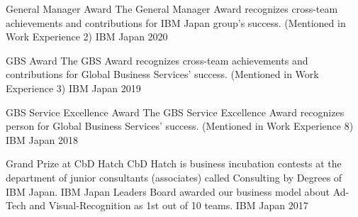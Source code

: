 



\begin{cvhonors}

  \cvhonor
    {General Manager Award} %
    {The General Manager Award recognizes cross-team achievements and contributions for IBM Japan group's success. (Mentioned in Work Experience 2)} %
    {IBM Japan} %
    {2020} %

  \cvhonor
    {GBS Award} %
    {The GBS Award recognizes cross-team achievements and contributions for Global Business Services' success. (Mentioned in Work Experience 3)} %
    {IBM Japan} %
    {2019} %

  \cvhonor
    {GBS Service Excellence Award} %
    {The GBS Service Excellence Award recognizes person for Global Business Services' success. (Mentioned in Work Experience 8)} %
    {IBM Japan} %
    {2018} %

  \cvhonor
    {Grand Prize at CbD Hatch} %
    {CbD Hatch is business incubation contests at the department of junior consultants (associates) called Consulting by Degrees of IBM Japan. IBM Japan Leaders Board awarded our business model about Ad-Tech and Visual-Recognition as 1st out of 10 teams.} %
    {IBM Japan} %
    {2017} %


\end{cvhonors}




